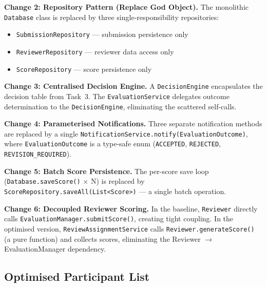 \documentclass[12pt, a4paper]{article}
\begin{document}
\textbf{Change 2: Repository Pattern (Replace God Object).}
The monolithic \texttt{Database} class is replaced by three single-responsibility repositories:
\begin{itemize}[nosep]
    \item \texttt{SubmissionRepository} --- submission persistence only
    \item \texttt{ReviewerRepository} --- reviewer data access only
    \item \texttt{ScoreRepository} --- score persistence only
\end{itemize}

\textbf{Change 3: Centralised Decision Engine.}
A \texttt{DecisionEngine} encapsulates the decision table from Task~3. The \texttt{EvaluationService} delegates outcome determination to the \texttt{DecisionEngine}, eliminating the scattered self-calls.

\textbf{Change 4: Parameterised Notifications.}
Three separate notification methods are replaced by a single \texttt{NotificationService.notify(EvaluationOutcome)}, where \texttt{EvaluationOutcome} is a type-safe enum (\texttt{ACCEPTED}, \texttt{REJECTED}, \texttt{REVISION\_REQUIRED}).

\textbf{Change 5: Batch Score Persistence.}
The per-score save loop (\texttt{Database.saveScore()} $\times$ N) is replaced by \texttt{ScoreRepository.saveAll(List<Score>)} --- a single batch operation.

\textbf{Change 6: Decoupled Reviewer Scoring.}
In the baseline, \texttt{Reviewer} directly calls \texttt{EvaluationManager.submitScore()}, creating tight coupling. In the optimised version, \texttt{ReviewAssignmentService} calls \texttt{Reviewer.generateScore()} (a pure function) and collects scores, eliminating the Reviewer $\rightarrow$ EvaluationManager dependency.

\subsection{Optimised Participant List}
\end{document}
